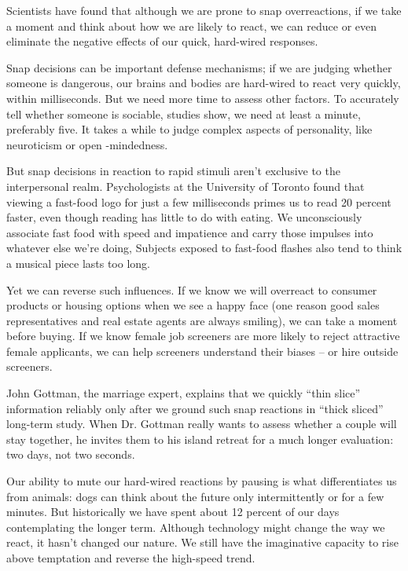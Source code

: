Scientists have found that although we are prone to snap overreactions, if we take a moment and think about how we are likely to react, we can reduce or even eliminate the negative effects of our quick, hard-wired responses.


Snap decisions can be important defense mechanisms; if we are judging whether someone is dangerous, our brains and bodies are hard-wired to react very quickly, within milliseconds. But we need more time to assess other factors. To accurately tell whether someone is sociable, studies show, we need at least a minute, preferably five. It takes a while to judge complex aspects of personality, like neuroticism or open -mindedness.


But snap decisions in reaction to rapid stimuli aren't exclusive to the interpersonal realm. Psychologists at the University of Toronto found that viewing a fast-food logo for just a few milliseconds primes us to read 20 percent faster, even though reading has little to do with eating. We unconsciously associate fast food with speed and impatience and carry those impulses into whatever else we're doing, Subjects exposed to fast-food flashes also tend to think a musical piece lasts too long.


Yet we can reverse such influences. If we know we will overreact to consumer products or housing options when we see a happy face (one reason good sales representatives and real estate agents are always smiling), we can take a moment before buying. If we know female job screeners are more likely to reject attractive female applicants, we can help screeners understand their biases – or hire outside screeners.


John Gottman, the marriage expert, explains that we quickly ``thin slice'' information reliably only after we ground such snap reactions in ``thick sliced'' long-term study. When Dr. Gottman really wants to assess whether a couple will stay together, he invites them to his island retreat for a much longer evaluation: two days, not two seconds.


Our ability to mute our hard-wired reactions by pausing is what differentiates us from animals: dogs can think about the future only intermittently or for a few minutes. But historically we have spent about 12 percent of our days contemplating the longer term. Although technology might change the way we react, it hasn't changed our nature. We still have the imaginative capacity to rise above temptation and reverse the high-speed trend.


